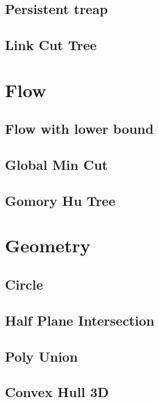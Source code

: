 \documentclass[a4paper,10pt,twocolumn,oneside]{article}
\begin{document}
\subsection{Persistent treap}


\subsection{Link Cut Tree}


\section{Flow}
\subsection{Flow with lower bound}


\subsection{Global Min Cut}


\subsection{Gomory Hu Tree}


\section{Geometry}
\subsection{Circle}


\subsection{Half Plane Intersection}


\subsection{Poly Union}


\subsection{Convex Hull 3D}

\end{document}
